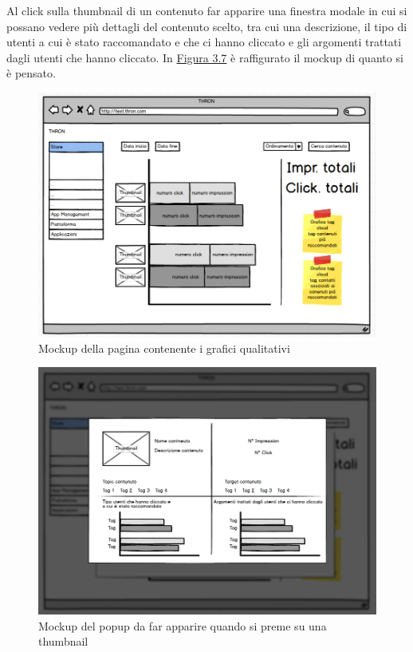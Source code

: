\documentclass[a4paper, 12pt, twoside, openright]{book}
\begin{document}
Al click sulla thumbnail di un contenuto far apparire una finestra modale in cui si possano vedere più dettagli del contenuto scelto, tra cui una descrizione, il tipo di utenti a cui è stato raccomandato e che ci hanno cliccato e gli argomenti trattati dagli utenti che hanno cliccato.
In \hyperref[grafico-qualitativo-2-mockup]{Figura 3.7} è raffigurato il mockup di quanto si è pensato.
\begin{figure}[H]
	\centering
	\label{grafico-qualitativo-1-mockup}	\includegraphics[width=1.0\textwidth]{images/grafico-qualitativo-1-mockup.jpg}
	\caption{Mockup della pagina contenente i grafici qualitativi}
\end{figure}
\begin{figure}[H]
	\centering
	\label{grafico-qualitativo-2-mockup}	\includegraphics[width=1.0\textwidth]{images/grafico-qualitativo-2-mockup.jpg}
	\caption{Mockup del popup da far apparire quando si preme su una thumbnail}
\end{figure} 
\end{document}
